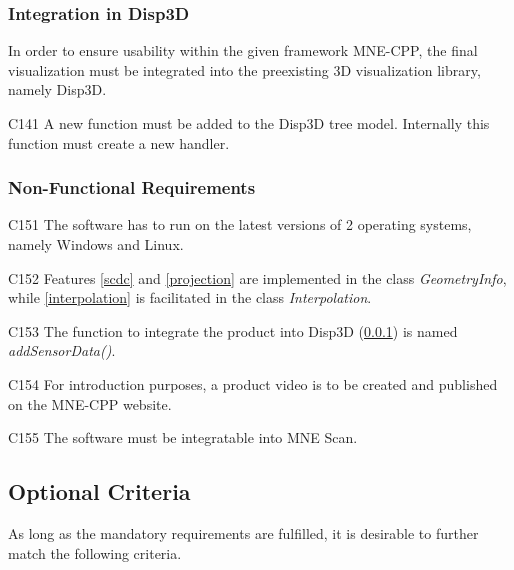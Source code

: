 \subsubsection{Integration in Disp3D} \label{integration}
	
	In order to ensure usability within the given framework MNE-CPP, the final visualization must be integrated into the 			preexisting 3D visualization library, namely Disp3D.
	
	\begin{aims}
		
		\item[C141] A new function must be added to the Disp3D tree model. Internally this function must create a new 								handler. 
		
	\end{aims}
	
\subsubsection{Non-Functional Requirements}		
	
	
	\begin{aims}

		\item[C151] The software has to run on the latest versions of 2 operating systems, namely Windows and Linux. 
		\item[C152] Features \ref{scdc} and \ref{projection} are implemented in the class \textit{GeometryInfo}, while \ref{interpolation} is facilitated in the class \textit{Interpolation}.
		\item[C153] The function to integrate the product into Disp3D (\ref{integration}) is named \textit{addSensorData()}.
		\item[C154] For introduction purposes, a product video is to be created and published on the MNE-CPP website.  
		\item[C155] The software must be integratable into MNE Scan. 
	\end{aims}
	
\newpage	
	
\subsection{Optional Criteria}
	
	As long as the mandatory requirements are fulfilled, it is desirable to further match the following criteria. 	
	
